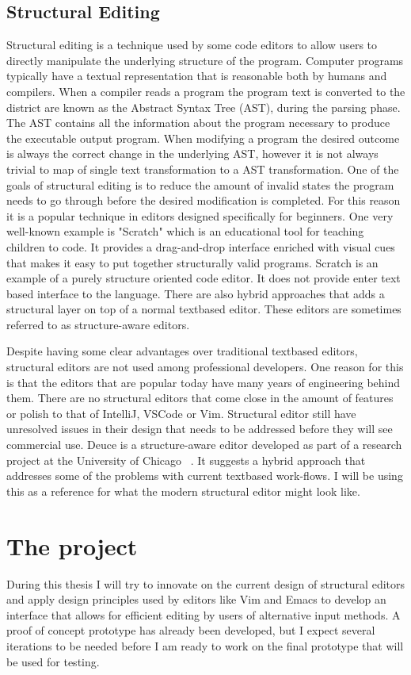\documentclass[a4paper,english]{ifimaster}
\begin{document}
\section{Structural Editing}
Structural editing is a technique used by some code editors to allow users to directly manipulate the underlying structure of the program.
Computer programs typically have a textual representation that is reasonable both by humans and compilers.
When a compiler reads a program the program text is converted to the district are known as the Abstract Syntax Tree (AST), during the parsing phase.
The AST contains all the information about the program necessary to produce the executable output program.
When modifying a program the desired outcome is always the correct change in the underlying AST, however it is not always
trivial to map of single text transformation to a AST transformation.
One of the goals of structural editing is to reduce the amount of invalid states the program needs to go through
before the desired modification is completed.
For this reason it is a popular technique in editors designed specifically for beginners.
One very well-known example is "Scratch" which is an educational tool for teaching children to code.
It provides a drag-and-drop interface enriched with visual cues that makes it easy to
put together structurally valid programs.
Scratch is an example of a purely structure oriented code editor.
It does not provide enter text based interface to the language.
There are also hybrid approaches that adds a structural layer on top of a normal textbased editor.
These editors are sometimes referred to as structure-aware editors.

Despite having some clear advantages over traditional textbased editors, structural editors are not used among professional developers.
One reason for this is that the editors that are popular today have many years of engineering behind them.
There are no structural editors that come close in the amount of features or polish to that of IntelliJ, VSCode or Vim.
Structural editor still have unresolved issues in their design that needs to be addressed before they will see commercial use.
Deuce is a structure-aware editor developed as part of a research project at the University of Chicago ~\parencite{deuce}.
It suggests a hybrid approach that addresses some of the problems with current textbased work-flows.
I will be using this as a reference for what the modern structural editor might look like.

\chapter{The project}
During this thesis I will try to innovate on the current design of structural editors
and apply design principles used by editors like Vim and Emacs to develop an interface
that allows for efficient editing by users of alternative input methods.
A proof of concept prototype has already been developed, but I expect several iterations
to be needed before I am ready to work on the final prototype that will be used for testing.
\end{document}
